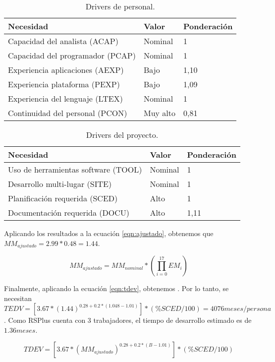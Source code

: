 \begin{table}[h]
\begin{center}
\begin{tabular}{ l l l }
\textbf{Necesidad} & \textbf{Valor} & \textbf{Ponderación} \\ \hline
Capacidad del analista (ACAP) &
Nominal &
1 \\
Capacidad del programador (PCAP) &
Nominal &
1 \\
Experiencia aplicaciones (AEXP) &
Bajo &
1,10 \\
Experiencia plataforma (PEXP) &
Bajo &
1,09 \\
Experiencia del lenguaje (LTEX) &
Nominal &
1 \\
Continuidad del personal (PCON) &
Muy alto &
0,81 \\ \hline
\end{tabular}
\caption{Drivers de personal.}
\label{tab:personal}
\end{center}
\end{table}

\begin{table}[h]
\begin{center}
\begin{tabular}{ l l l }
\textbf{Necesidad} & \textbf{Valor} & \textbf{Ponderación} \\ \hline
Uso de herramientas software (TOOL) &
Nominal &
1 \\
Desarrollo multi-lugar (SITE) &
Nominal &
1 \\
Planificación requerida (SCED) &
Alto &
1 \\
Documentación requerida (DOCU) &
Alto &
1,11 \\ \hline
\end{tabular}
\caption{Drivers del proyecto.}
\label{tab:proyecto}
\end{center}
\end{table}

\par Aplicando los resultados a la ecuación \ref{eqn:ajustado}, obtenemos que $MM_{ajustado} = 2.99 * 0.48 =  1.44$.

\begin{equation} \label{eqn:ajustado}MM_{ajustado} = MM_{nominal}*(\prod_{i=0}^{17}EM_{i})\end{equation}


\par Finalmente, aplicando la ecuación \ref{eqn:tdev}, obtenemos $ $. Por lo tanto, se necesitan $TEDV=[3.67*(1.44)^{0.28+0.2*(1.048-1.01)}]*(\%SCED/100)=4076meses/persona$. Como RSPlus cuenta con 3 trabajadores, el tiempo de desarrollo estimado es de $1.36 meses $.

\begin{equation} \label{eqn:tdev}
TDEV = [3.67*(MM_{ajustado})^{0.28+0.2*(B-1.01)}]*(\%SCED/100)
\end{equation}
